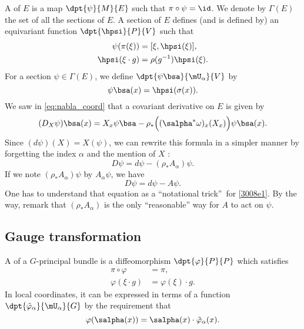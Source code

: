 A  of $E$ is a map $\dpt{\psi}{M}{E}$ such that $\pi\circ\psi=\id$. We denote by $\Gamma(E)$ the set of all the sections of $E$. A section of $E$ defines (and is defined by) an equivariant function $\dpt{\hpsi}{P}{V}$ such that
\begin{subequations}
\begin{align}
  \psi(\pi(\xi))&=[\xi,\hpsi(\xi)],\\
  \hpsi(\xi\cdot g)&=\rho(g^{-1})\hpsi(\xi).
\end{align}
\end{subequations}
For a section $\psi\in\Gamma(E)$, we define $\dpt{\psi\bsa}{\mU_{\alpha}}{V}$ by
 \[
 \psi\bsa(x)=\hpsi(\sigma(x)).
 \]
We saw in \eqref{eq:nabla_coord} that a covariant derivative on $E$ is given by
\begin{equation}\label{3008e1}
  (D_X\psi)\bsa(x)=X_x\psi\bsa-\rho_*\Big((\salpha^*\omega)_x(X_x)\Big)\psi\bsa(x).
\end{equation}
Since $(d\psi)(X)=X(\psi)$, we can rewrite this formula in a simpler manner by forgetting the index $\alpha$ and the mention of $X$ :
\[
    D\psi=d\psi-(\rho_*A_{\alpha})\psi.
\]
If we note $(\rho_*A_{\alpha})\psi$ by $A_{\alpha}\psi$, we have
\begin{equation}
        D\psi=d\psi-A\psi.
\end{equation}
One has to understand that equation as a ``notational trick''\ for \eqref{3008e1}. By the way, remark that $(\rho_*A_{\alpha})$ is the only ``reasonable'' way for $A$ to act on $\psi$.

\subsection{Gauge transformation}

A  of a $G$-principal bundle is a diffeomorphism $\dpt{\varphi}{P}{P}$ which satisfies
\begin{subequations}
\begin{align}
   \pi\circ\varphi&=\pi,\\
   \varphi(\xi\cdot g)&=\varphi(\xi)\cdot g.
\end{align}
\end{subequations}
In local coordinates, it can be expressed in terms of a function $\dpt{\tilde{\varphi}_{\alpha}}{\mU_{\alpha}}{G}$ by the requirement that
\begin{equation}\label{def_vpt}
    \varphi(\salpha(x))=\salpha(x)\cdot\tilde{\varphi}_{\alpha}(x).
\end{equation}

